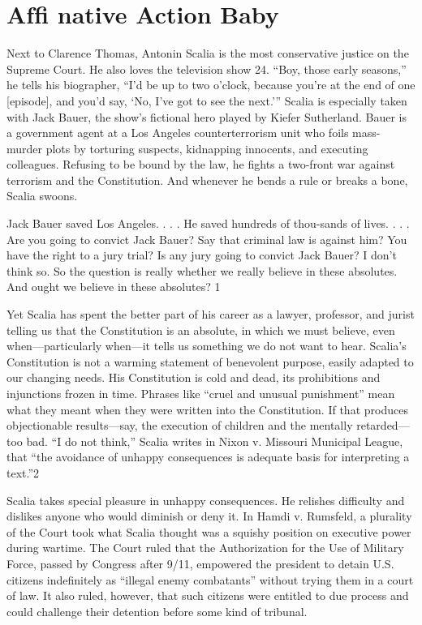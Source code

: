 \chapter{Afﬁ native Action Baby}\label{Afﬁ native Action Baby}
 \par 
Next to Clarence Thomas, Antonin Scalia is the most conservative justice on the Supreme Court. He also loves the television show {\color{blue}24}. “Boy, those early seasons,” he tells his biographer, “I’d be up to two o’clock, because you’re at the end of one [episode], and you’d say, ‘No, I’ve got to see the next.’” Scalia is especially taken with Jack Bauer, the show’s fictional hero played by Kiefer Sutherland. Bauer is a government agent at a Los Angeles counterterrorism unit who foils mass-murder plots by torturing suspects, kidnapping innocents, and executing colleagues. Refusing to be bound by the law, he fights a two-front war against terrorism and the Constitution. And whenever he bends a rule or breaks a bone, Scalia swoons.
 \par 
Jack Bauer saved Los Angeles. . . . He saved hundreds of thou-sands of lives. . . . Are you going to convict Jack Bauer? Say that criminal law is against him? You have the right to a jury trial? Is any jury going to convict Jack Bauer? I don’t think so. So the question is really whether we really believe in these absolutes. And ought we believe in these absolutes? {\color{blue}1}
 \par 
Yet Scalia has spent the better part of his career as a lawyer, professor, and jurist telling us that the Constitution is an absolute, in which we must believe, even when—particularly when—it tells us something we do not want to hear. Scalia’s Constitution is not a warming statement of benevolent purpose, easily adapted to our changing needs. His Constitution is cold and dead, its prohibitions and injunctions frozen in time. Phrases like “cruel and unusual punishment” mean what they meant when they were written into the Constitution. If that produces objectionable results—say, the execution of children and the mentally retarded—too bad. “I do not think,” Scalia writes in Nixon v. Missouri Municipal League, that “the avoidance of unhappy consequences is adequate basis for interpreting a text.”{\color{blue}2}
 \par 
Scalia takes special pleasure in unhappy consequences. He relishes difficulty and dislikes anyone who would diminish or deny it. In Hamdi v. Rumsfeld, a plurality of the Court took what Scalia thought was a squishy position on executive power during wartime. The Court ruled that the Authorization for the Use of Military Force, passed by Congress after 9/11, empowered the president to detain U.S. citizens indefinitely as “illegal enemy combatants” without trying them in a court of law. It also ruled, however, that such citizens were entitled to due process and could challenge their detention before some kind of tribunal.
